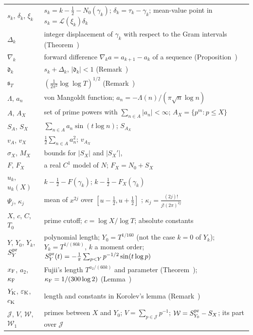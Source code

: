 \documentclass[preprint,12pt]{elsarticle}
\makeatletter
\let\CG@origref\ref
\let\CG@origeqref\eqref
\newcommand{\CG@gettip}[1]{\@ifundefined{CGTip@#1}{Reference: #1}{\csname CGTip@#1\endcsname}}
\DeclareRobustCommand{\CGref}[1]{\pdftooltip{\CG@origref{#1}}{\CG@gettip{#1}}}
\DeclareRobustCommand{\CGeqref}[1]{\pdftooltip{\CG@origeqref{#1}}{\CG@gettip{#1}}}
\numberwithin{equation}{section}
\theoremstyle{plain}
\theoremstyle{definition}
\theoremstyle{remark}
\newcommand{\NO}{N_0}
\newcommand{\lL}{\mathcal L}
\makeatother
\begin{document}
\begin{center}
\begin{longtable}{p{}p{}}
$s_k$, $\delta_k$, $\xi_k$ & $s_k=k-\frac12-\NO(\gamma_k)$; $\delta_k=\tau_k-\gamma_k$; mean-value point in $s_k=\lL(\xi_k)\delta_k$\\
$\Delta_k$ & integer displacement of $\gamma_k$ with respect to the Gram intervals (Theorem~\CGref{thm:known_korolev})\\
$\nabla_k$ & forward difference $\nabla_ka=a_{k+1}-a_k$ of a sequence (Proposition~\CGref{prop:deformation})\\
$\mathfrak d_k$ & $s_k+\Delta_k$, $|\mathfrak d_k|<1$ (Remark~\CGref{rem:korolev})\\
$\mathfrak s_T$ & $(\frac1{2\pi^2}\log\log T)^{1/2}$ (Remark~\CGref{rem:korolev})\\
$\Lambda$, $a_n$ & von Mangoldt function; $a_n=-\Lambda(n)/(\pi\sqrt n\log n)$\\
$A$, $A_X$ & set of prime powers with $\sum_{n\in A}|a_n|<\infty$; $A_X=\{p^m:p\le X\}$\\
$S_A$, $S_X$ & $\sum_{n\in A}a_n\sin(t\log n)$; $S_{A_X}$\\
$v_A$, $v_X$ & $\frac12\sum_{n\in A}a_n^2$; $v_{A_X}$\\
$\sigma_X$, $M_X$ & bounds for $|S_X|$ and $|S_X'|$, \CGeqref{eq:sigma_M_def}\\
$F$, $F_X$ & a real $C^1$ model of $N$; $F_X=\NO+S_X$\\
$u_k$, $u_k(X)$ & $k-\frac12-F(\gamma_k)$; $k-\frac12-F_X(\gamma_k)$\\
$\Psi_j$, $\kappa_j$ & mean of $x^{2j}$ over $[u-\frac12,u+\frac12]$ \CGeqref{eq:Psi_def}; $\kappa_j=\frac{(2j)!}{j!(2\pi)^{2j}}$\\
$X$, $c$, $C$, $T_0$ & prime cutoff; $c=\log X/\log T$; absolute constants\\
$Y$, $Y_0$, $Y_k$, $S^{\rm pr}_Y$ & polynomial length; $Y_0=T^{1/160}$ (not the case $k=0$ of $Y_k$); $Y_k=T^{1/(80k)}$, $k$ a moment order; $S^{\rm pr}_Y(t)=-\frac1\pi\sum_{p<Y}p^{-1/2}\sin(t\log p)$\\
$x_{\rm F}$, $a_2$, $\kappa_{\rm F}$ & Fujii's length $T^{a_2/(60k)}$ and parameter (Theorem~\CGref{thm:known_fujii_selberg}); $\kappa_{\rm F}=1/(300\log2)$ (Lemma~\CGref{lem:selberg_uniform})\\
$Y_{\rm K}$, $\varepsilon_{\rm K}$, $c_{\rm K}$ & length and constants in Korolev's lemma (Remark~\CGref{rem:korolev_uniform})\\
$\mathcal J$, $V$, $\mathcal W$, $\mathcal W_1$ & primes between $X$ and $Y_0$; $V=\sum_{p\in\mathcal J}p^{-1}$; $\mathcal W=S^{\rm pr}_{Y_0}-S_X$; its part over $\mathcal J$ \CGeqref{eq:D_def}\\

\end{longtable}
\end{center}
\end{document}
